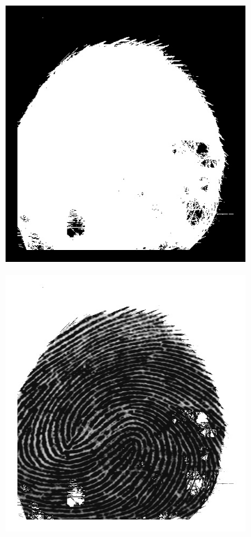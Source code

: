 \documentclass{beamer}
\begin{document}
{\begin{figure}[!ht]
\begin{subfigure}[ht]{0.15\textwidth}
        \end{subfigure}
        \qquad
        \begin{subfigure}[ht]{0.15\textwidth}
            \includegraphics[width=\textwidth]{fingerprints/2000Db3a/1_3_mask.jpg}
        \end{subfigure}
        \qquad
        \begin{subfigure}[ht]{0.15\textwidth}
            \includegraphics[width=\textwidth]{fingerprints/2000Db3a/1_3_filtered.jpg}
        \end{subfigure}
    \end{figure}
}
\end{document}

